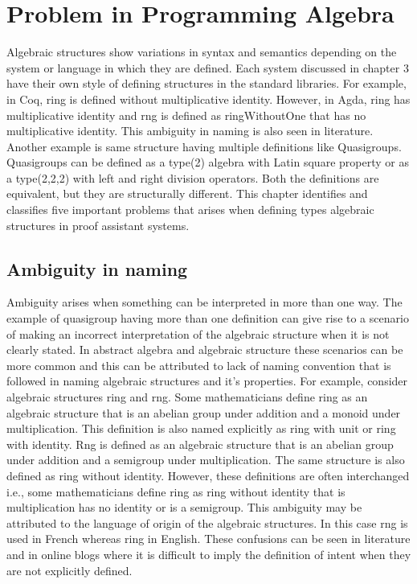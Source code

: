 \chapter{Problem in Programming Algebra}
Algebraic structures show variations in syntax and semantics depending on the
system or language in which they are defined. Each system discussed in chapter 3
have their own style of defining structures in the standard libraries. For
example, in Coq, ring is defined without multiplicative identity. However, in
Agda, ring has multiplicative identity and rng is defined as ringWithoutOne that
has no multiplicative identity. This ambiguity in naming is also seen in
literature. Another example is same structure having multiple definitions like
Quasigroups. Quasigroups can be defined as a type(2) algebra with Latin square
property or as a type(2,2,2) with left and right division operators. Both the
definitions are equivalent, but they are structurally different. This chapter
identifies and classifies five important problems that arises when defining
types algebraic structures in proof assistant systems. 

\section{Ambiguity in naming}
Ambiguity arises when something can be interpreted in more than one way. The
example of quasigroup having more than one definition can give rise to a
scenario of making an incorrect interpretation of the algebraic structure when
it is not clearly stated. In abstract algebra and algebraic structure these
scenarios can be more common and this can be attributed to lack of naming
convention that is followed in naming algebraic structures and it's properties.
For example, consider algebraic structures ring and rng. Some mathematicians
define ring as an algebraic structure that is an abelian group under addition
and a monoid under multiplication. This definition is also named explicitly as
ring with unit or ring with identity. Rng is defined as an algebraic structure
that is an abelian group under addition and a semigroup under multiplication.
The same structure is also defined as ring without identity. However, these
definitions are often interchanged i.e., some mathematicians define ring as ring
without identity that is multiplication has no identity or is a semigroup. This
ambiguity may be attributed to the language of origin of the algebraic
structures. In this case rng is used in French whereas ring in English. These
confusions can be seen in literature and in online blogs where it is difficult
to imply the definition of intent when they are not explicitly defined. 

